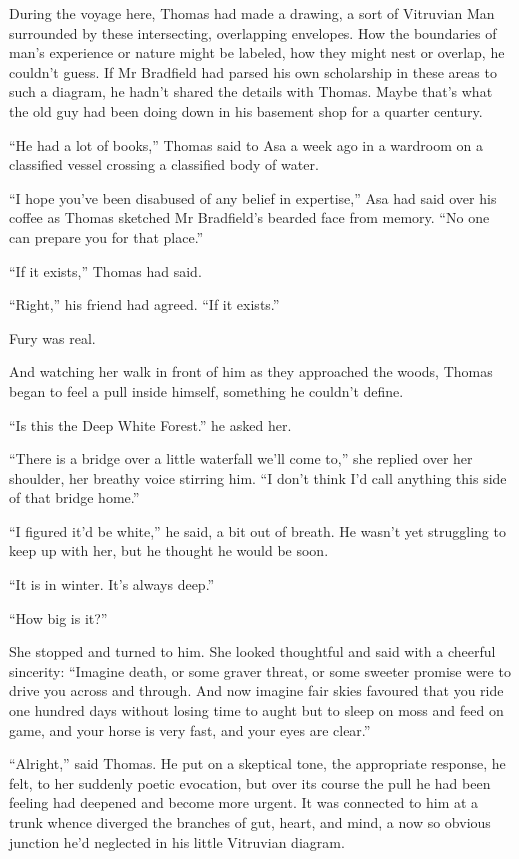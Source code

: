 \documentclass[11pt,a5paper]{article}
\begin{document}
During the voyage here, Thomas had made a drawing, a sort of Vitruvian Man surrounded by these intersecting, overlapping envelopes. How the boundaries of man's experience or nature might be labeled, how they might nest or overlap, he couldn't guess. If Mr Bradfield had parsed his own scholarship in these areas to such a diagram, he hadn't shared the details with Thomas. Maybe that's what the old guy had been doing down in his basement shop for a quarter century.

``He had a lot of books,'' Thomas said to Asa a week ago in a wardroom on a classified vessel crossing a classified body of water.

``I hope you've been disabused of any belief in expertise,'' Asa had said over his coffee as Thomas sketched Mr Bradfield's bearded face from memory. ``No one can prepare you for that place.''

``If it exists,'' Thomas had said.

``Right,'' his friend had agreed. ``If it exists.''

Fury was real.

And watching her walk in front of him as they approached the woods, Thomas began to feel a pull inside himself, something he couldn't define.

``Is this the Deep White Forest.'' he asked her.

``There is a bridge over a little waterfall we'll come to,'' she replied over her shoulder, her breathy voice stirring him. ``I don't think I'd call anything this side of that bridge home.''

``I figured it'd be white,'' he said, a bit out of breath. He wasn't yet struggling to keep up with her, but he thought he would be soon.

``It is in winter. It's always deep.''

``How big is it?''

She stopped and turned to him. She looked thoughtful and said with a cheerful sincerity: ``Imagine death, or some graver threat, or some sweeter promise were to drive you across and through. And now imagine fair skies favoured that you ride one hundred days without losing time to aught but to sleep on moss and feed on game, and your horse is very fast, and your eyes are clear.''

``Alright,'' said Thomas. He put on a skeptical tone, the appropriate response, he felt, to her suddenly poetic evocation, but over its course the pull he had been feeling had deepened and become more urgent. It was connected to him at a trunk whence diverged the branches of gut, heart, and mind, a now so obvious junction he'd neglected in his little Vitruvian diagram.
\end{document}
